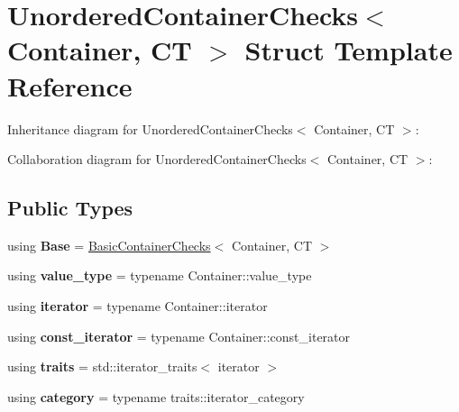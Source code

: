 \hypertarget{struct_unordered_container_checks}{}\section{Unordered\+Container\+Checks$<$ Container, CT $>$ Struct Template Reference}
\label{struct_unordered_container_checks}


Inheritance diagram for Unordered\+Container\+Checks$<$ Container, CT $>$\+:


Collaboration diagram for Unordered\+Container\+Checks$<$ Container, CT $>$\+:
\subsection*{Public Types}
\begin{DoxyCompactItemize}
\item 
\mbox{\label{struct_unordered_container_checks_a2444724c40c0562bff58eeea2ea6c80a}} 
using {\bfseries Base} = \mbox{\hyperlink{struct_iterator_debug_checks_1_1_basic_container_checks}{Basic\+Container\+Checks}}$<$ Container, CT $>$
\item 
\mbox{\label{struct_unordered_container_checks_ad4af54cc5830ea1ea62481b15519011d}} 
using {\bfseries value\+\_\+type} = typename Container\+::value\+\_\+type
\item 
\mbox{\label{struct_unordered_container_checks_aecb12b3f1864ce08582b0d833b951606}} 
using {\bfseries iterator} = typename Container\+::iterator
\item 
\mbox{\label{struct_unordered_container_checks_a9cfc43e63f599ad5a1352bae6282d04c}} 
using {\bfseries const\+\_\+iterator} = typename Container\+::const\+\_\+iterator
\item 
\mbox{\label{struct_unordered_container_checks_a87d299265b8308c88f36edcfc2b8ed2d}} 
using {\bfseries traits} = std\+::iterator\+\_\+traits$<$ iterator $>$
\item 
\mbox{\label{struct_unordered_container_checks_aec4885ccc766fd4beef0c324b48bcccc}} 
using {\bfseries category} = typename traits\+::iterator\+\_\+category
\end{DoxyCompactItemize}
